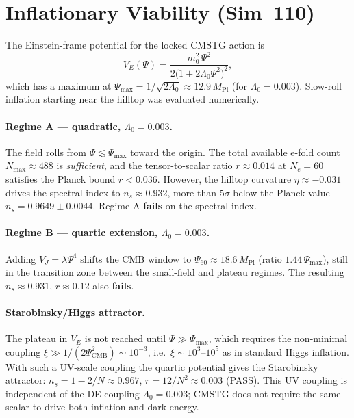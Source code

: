 \documentclass[12pt,a4paper]{article}
\begin{document}
\section{Inflationary Viability (Sim~110)}
\label{sec:sim110}

The Einstein-frame potential for the locked CMSTG action is
\begin{equation}
V_E(\Psi) = \frac{m_0^2\,\Psi^2}{2\bigl(1+2\Lambda_0\Psi^2\bigr)^2},
\end{equation}
which has a maximum at $\Psi_\mathrm{max}=1/\sqrt{2\Lambda_0}\approx12.9\,M_\mathrm{Pl}$
(for $\Lambda_0=0.003$). Slow-roll inflation starting near the hilltop was evaluated
numerically.

\paragraph{Regime A — quadratic, $\Lambda_0=0.003$.}
The field rolls from $\Psi\lesssim\Psi_\mathrm{max}$ toward the origin.
The total available e-fold count $N_\mathrm{max}\approx488$ is
\emph{sufficient}, and the tensor-to-scalar ratio $r\approx0.014$ at $N_e=60$
satisfies the Planck bound $r<0.036$.  However, the hilltop curvature
$\eta\approx-0.031$ drives the spectral index to $n_s\approx0.932$,
more than $5\sigma$ below the Planck value $n_s=0.9649\pm0.0044$.
Regime A \textbf{fails} on the spectral index.

\paragraph{Regime B — quartic extension, $\Lambda_0=0.003$.}
Adding $V_J=\lambda\Psi^4$ shifts the CMB window to $\Psi_{60}\approx18.6\,M_\mathrm{Pl}$
(ratio $1.44\,\Psi_\mathrm{max}$), still in the transition zone between the
small-field and plateau regimes.  The resulting $n_s\approx0.931$, $r\approx0.12$
also \textbf{fails}.

\paragraph{Starobinsky/Higgs attractor.}
The plateau in $V_E$ is not reached until $\Psi\gg\Psi_\mathrm{max}$, which
requires the non-minimal coupling $\xi\gg1/(2\Psi_\mathrm{CMB}^2)\sim10^{-3}$,
i.e.\ $\xi\sim10^3$--$10^5$ as in standard Higgs inflation.  With such a
UV-scale coupling the quartic potential gives the Starobinsky attractor:
$n_s=1-2/N\approx0.967$, $r=12/N^2\approx0.003$ (PASS).  This UV coupling
is independent of the DE coupling $\Lambda_0=0.003$; CMSTG does not require
the same scalar to drive both inflation and dark energy.
\end{document}
